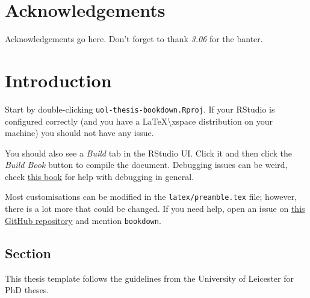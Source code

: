 \documentclass[
  12pt,
  oneside]{book}
\begin{document}
\cleardoublepage

\chapter*{Acknowledgements}
{}


Acknowledgements go here.
Don't forget to thank \emph{3.06} for the banter.


\cleardoublepage


\renewcommand{\contentsname}{Table of Contents}
\tableofcontents

\listoffigures

\listoftables


\cleardoublepage

\mainmatter

\hypertarget{intro}{%
\chapter{Introduction}\label{intro}}

Start by double-clicking \texttt{uol-thesis-bookdown.Rproj}.
If your RStudio is configured correctly (and you have a \LaTeX\textbackslash xspace distribution on your machine) you should not have any issue.

You should also see a \emph{Build} tab in the RStudio UI.
Click it and then click the \emph{Build Book} button to compile the document.
Debugging issues can be weird, check \href{https://www.goodreads.com/en/book/show/29437996-copying-and-pasting-from-stack-overflow}{this book} for help with debugging in general.

Most customisations can be modified in the \texttt{latex/preamble.tex} file; however, there is a lot more that could be changed.
If you need help, open an issue on \href{https://github.com/ellessenne/uol-thesis}{this GitHub repository} and mention \texttt{bookdown}.

\hypertarget{intro-section}{%
\section{Section}\label{intro-section}}

This thesis template follows the guidelines from the University of Leicester for PhD theses.
\end{document}
